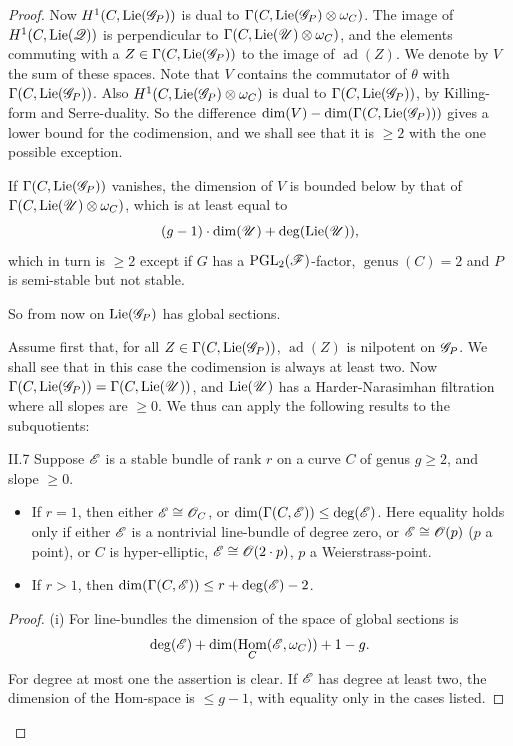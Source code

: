 \documentclass[12pt,english]{smfart}
\DeclareMathOperator{\Hom}{Hom} \DeclareMathOperator{\Ext}{Ext} \DeclareMathOperator{\Der}{Der} \DeclareMathOperator{\rank}{rank} \DeclareMathOperator{\rk}{rk} \DeclareMathOperator{\Spec}{Spec} \DeclareMathOperator{\depth}{depth} \DeclareMathOperator{\genus}{genus} \DeclareMathOperator{\Lie}{Lie} \DeclareMathOperator{\Ad}{Ad} \DeclareMathOperator{\ad}{ad} \DeclareMathOperator{\id}{id} \DeclareMathOperator{\tr}{tr} \DeclareMathOperator{\ch}{ch} \DeclareMathOperator{\Td}{Td} \DeclareMathOperator{\gr}{gr} \DeclareMathOperator{\Pic}{Pic} \DeclareMathOperator{\Aut}{Aut} \DeclareMathOperator{\Out}{Out} \DeclareMathOperator{\Gal}{Gal} \DeclareMathOperator{\PGL}{PGL} \DeclareMathOperator{\GL}{GL} \DeclareMathOperator{\SL}{SL} \DeclareMathOperator{\Ima}{Im} \newcommand{\HDR}{H_{\mathrm{DR}}} \newcommand{\Mpar}{\sM^{0}_{\theta}(\sG)_{\mathrm{par}}}
\theoremstyle{plain} \newtheorem{innerthm}{Theorem} \newtheorem{innerlem}{Lemma} \newtheorem{innerprop}{Proposition} \newtheorem{innercor}{Corollary} \theoremstyle{definition} \newtheorem{innerdefn}{Definition} \newtheorem{innerconstr}{Construction} \theoremstyle{remark} \newtheorem*{remark}{Remark} \newtheorem*{remarks}{Remarks} \newtheorem*{applications}{Applications}
\begin{document}
\begin{proof}
Now $H^1(C,\Lie(\sG_P))$ is dual to $\Gamma(C,\Lie(\sG_P)\otimes\omega_C)$. The image of $H^1(C,\Lie(\sQ))$ is perpendicular to $\Gamma(C,\Lie(\sU)\otimes\omega_C)$, and the elements commuting with a $Z\in\Gamma(C,\Lie(\sG_P))$ to the image of $\ad(Z)$. We denote by $V$ the sum of these spaces. Note that $V$ contains the commutator of $\theta$ with $\Gamma(C,\Lie(\sG_P))$. Also $H^1(C,\Lie(\sG_P)\otimes\omega_C)$ is dual to $\Gamma(C,\Lie(\sG_P))$, by Killing-form and Serre-duality. So the difference $\dim(V)-\dim(\Gamma(C,\Lie(\sG_P)))$ gives a lower bound for the codimension, and we shall see that it is $\ge 2$ with the one possible exception.

If $\Gamma(C,\Lie(\sG_P))$ vanishes, the dimension of $V$ is bounded below by that of $\Gamma(C,\Lie(\sU)\otimes\omega_C)$, which is at least equal to
\[
(g-1)\cdot\dim(\sU)+\deg(\Lie(\sU)),
\]
which in turn is $\ge 2$ except if $G$ has a $\PGL_2(\sF)$-factor, $\genus(C)=2$ and $P$ is semi-stable but not stable.

So from now on $\Lie(\sG_P)$ has global sections.

Assume first that, for all $Z\in\Gamma(C,\Lie(\sG_P))$, $\ad(Z)$ is nilpotent on $\mathscr{G}_P$. We shall see that in this case the codimension is always at least two. Now $\Gamma(C,\Lie(\sG_P))=\Gamma(C,\Lie(\sU))$, and $\Lie(\sU)$ has a Harder-Narasimhan filtration where all slopes are $\ge 0$. We thus can apply the following results to the subquotients:

\begin{lemma}{II.7}\label{lem:II.7}
Suppose $\mathscr{E}$ is a stable bundle of rank $r$ on a curve $C$ of genus $g\ge 2$, and slope $\ge 0$.
\begin{itemize}
\item[(i)] If $r=1$, then either $\mathscr{E}\cong\mathscr{O}_C$, or
$\dim(\Gamma(C,\mathscr{E}))\le\deg(\mathscr{E})$. Here equality holds only if either $\mathscr{E}$ is a nontrivial line-bundle of degree zero, or $\mathscr{E}\cong\mathscr{O}(p)$ ($p$ a point), or $C$ is hyper-elliptic, $\mathscr{E}\cong\mathscr{O}(2\cdot p)$, $p$ a Weierstrass-point.
\item[(ii)] If $r>1$, then $\dim(\Gamma(C,\mathscr{E}))\le r+\deg(\mathscr{E})-2$.
\end{itemize}
\end{lemma}

\begin{proof}
(i) For line-bundles the dimension of the space of global sections is
\[
\deg(\sE)+\dim(\Hom_C(\sE,\omega_C))+1-g.
\]
For degree at most one the assertion is clear. If $\mathscr{E}$ has degree at least two, the dimension of the Hom-space is $\le g-1$, with equality only in the cases listed.


\end{proof}
\end{proof}
\end{document}
